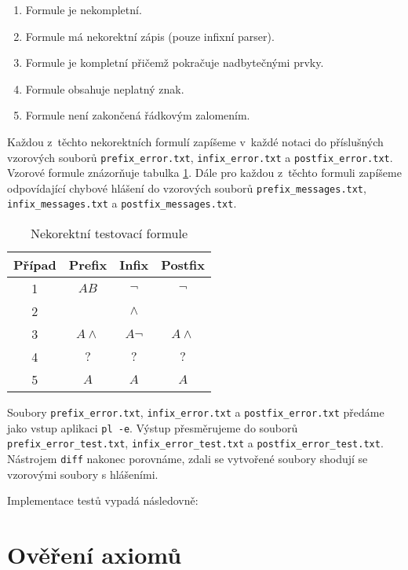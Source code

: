 \documentclass[thesis=B,czech,hidelinks]{FITthesis}[2012/06/26]
\begin{document}
\begin{enumerate}
	\item Formule je nekompletní.
	\item Formule má nekorektní zápis (pouze infixní parser).
	\item Formule je kompletní přičemž pokračuje nadbytečnými prvky.
	\item Formule obsahuje neplatný znak.
	\item Formule není zakončená řádkovým zalomením.
\end{enumerate}

Každou z~těchto nekorektních formulí zapíšeme v~každé notaci do příslušných vzorových souborů \texttt{prefix\_error.txt}, \texttt{infix\_error.txt} a \texttt{postfix\_error.txt}. Vzorové formule znázorňuje tabulka \ref{tab:parsern}. Dále pro každou z~těchto formuli zapíšeme odpovídající chybové hlášení do vzorových souborů \texttt{prefix\_messages.txt}, \texttt{infix\_messages.txt} a \texttt{postfix\_messages.txt}.

\begin{table}
\centering
\caption{Nekorektní testovací formule}
\label{tab:parsern}
\begin{tabular}{|c|c|c|c|}\hline
	Případ & Prefix & Infix & Postfix \tabularnewline \hline \hline
	1 & $AB$ & $\neg$ & $\neg$ \tabularnewline \hline
	2 & & $\wedge$ & \tabularnewline \hline
	3 & $A \wedge$ & $A \neg$ & $A \wedge$ \tabularnewline \hline
	4 & $?$ & $?$ & $?$ \tabularnewline \hline
	5 & $A$ & $A$ & $A$ \tabularnewline \hline
\end{tabular}
\end{table}

Soubory \texttt{prefix\_error.txt}, \texttt{infix\_error.txt} a \texttt{postfix\_error.txt} předáme jako vstup aplikaci \texttt{pl -e}. Výstup přesměrujeme do souborů \texttt{prefix\_error\_test.txt}, \texttt{infix\_error\_test.txt} a \texttt{postfix\_error\_test.txt}. Nástrojem \texttt{diff} nakonec porovnáme, zdali se vytvořené soubory shodují se vzorovými soubory s hlášeními.

Implementace testů vypadá následovně:

\begin{center}

\end{center}

\section{Ověření axiomů}
\end{document}
